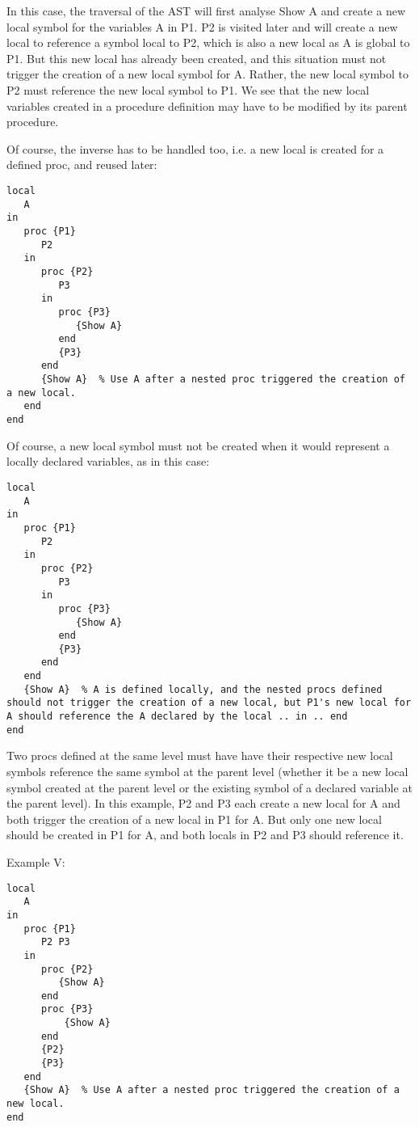 \documentclass[a4paper]{memoir}
\begin{document}
In this case, the traversal of the AST will first analyse {Show A} and create a new local symbol for the variables A in P1. P2 is visited later and will create a new local to reference a symbol local to P2, which is also a new local as A is global to P1. But this new local has already been created, and this situation must not trigger the creation of a new local symbol for A. Rather, the new local symbol to P2 must reference the new local symbol to P1. We see that the new local variables created in a procedure definition may have to be modified by its parent procedure.

Of course, the inverse has to be handled too, i.e. a new local is created for a defined proc, and reused later:

\begin{lstlisting}
local
   A
in
   proc {P1}
      P2
   in
      proc {P2}
         P3
      in
         proc {P3}
            {Show A}
         end
         {P3}
      end
      {Show A}  % Use A after a nested proc triggered the creation of a new local.
   end
end
\end{lstlisting}


Of course, a new local symbol must not be created when it would represent a locally declared variables, as in this case:

\begin{lstlisting}
local
   A
in
   proc {P1}
      P2
   in
      proc {P2}
         P3
      in
         proc {P3}
            {Show A}
         end
         {P3}
      end
   end
   {Show A}  % A is defined locally, and the nested procs defined should not trigger the creation of a new local, but P1's new local for A should reference the A declared by the local .. in .. end
end
\end{lstlisting}

Two procs defined at the same level must have have their respective new local symbols reference the same symbol at the parent level (whether it be a new local symbol created at the parent level or the existing symbol of a declared variable at the parent level). In this example, P2 and P3 each create a new local for A and both trigger the creation of a new local in P1 for A. But only one new local should be created in P1 for A, and both locals in P2 and P3 should reference it.


Example V:
\begin{lstlisting}
local
   A
in
   proc {P1}
      P2 P3
   in
      proc {P2}
         {Show A}
      end
      proc {P3}
          {Show A}
      end
      {P2}
      {P3}
   end
   {Show A}  % Use A after a nested proc triggered the creation of a new local.
end
\end{lstlisting}
\end{document}
